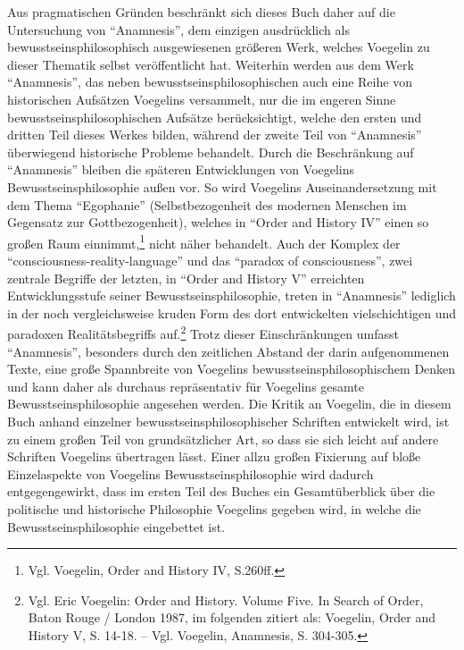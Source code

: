 Aus pragmatischen Gründen beschränkt sich dieses Buch daher auf die
Untersuchung von "`Anamnesis"', dem einzigen ausdrücklich als
bewusstseinsphilosophisch ausgewiesenen größeren Werk, welches Voegelin zu
dieser Thematik selbst veröffentlicht hat. Weiterhin werden aus dem Werk
"`Anamnesis"', das neben bewusstseinsphilosophischen auch eine Reihe von
historischen Aufsätzen Voegelins versammelt, nur die im engeren Sinne
bewusstseinsphilosophischen Aufsätze berücksichtigt, welche den ersten und
dritten Teil dieses Werkes bilden, während der zweite Teil von "`Anamnesis"'
überwiegend historische Probleme behandelt. Durch die Beschränkung auf
"`Anamnesis"' bleiben die späteren Entwicklungen von Voegelins
Bewusstseinsphilosophie außen vor. So wird Voegelins Auseinandersetzung mit
dem Thema "`Egophanie"' (Selbstbezogenheit des modernen Menschen im Gegensatz
zur Gottbezogenheit), welches in "`Order and History IV"' einen so großen Raum
einnimmt,\footnote{Vgl. Voegelin, Order and History IV, S.260ff.} nicht näher
behandelt. Auch der Komplex der "`consciousness-reality-language"' und das
"`paradox of consciousness"', zwei zentrale Begriffe der letzten, in "`Order
and History V"' erreichten Entwicklungsstufe seiner Bewusstseinsphilosophie,
treten in "`Anamnesis"' lediglich in der noch vergleichsweise kruden Form des
dort entwickelten vielschichtigen und paradoxen Realitätsbegriffs
auf.\footnote{Vgl. Eric Voegelin: Order and History. Volume Five. In Search of
  Order, Baton Rouge / London 1987, im folgenden zitiert als: Voegelin, Order
  and History V, S. 14-18.  -- Vgl. Voegelin, Anamnesis, S. 304-305.} Trotz
dieser Einschränkungen umfasst "`Anamnesis"', besonders durch den zeitlichen
Abstand der darin aufgenommenen Texte, eine große Spannbreite von Voegelins
bewusstseinsphilosophischem Denken und kann daher als durchaus repräsentativ
für Voegelins gesamte Bewusstseinsphilosophie angesehen werden. Die Kritik an
Voegelin, die in diesem Buch anhand einzelner bewusstseinsphilosophischer
Schriften entwickelt wird, ist zu einem großen Teil von grundsätzlicher Art,
so dass sie sich leicht auf andere Schriften Voegelins übertragen lässt. Einer
allzu großen Fixierung auf bloße Einzelaspekte von Voegelins
Bewusstseinsphilosophie wird dadurch entgegengewirkt, dass im ersten Teil des
Buches ein Gesamtüberblick über die politische und historische Philosophie
Voegelins gegeben wird, in welche die Bewusstseinsphilosophie eingebettet ist.


